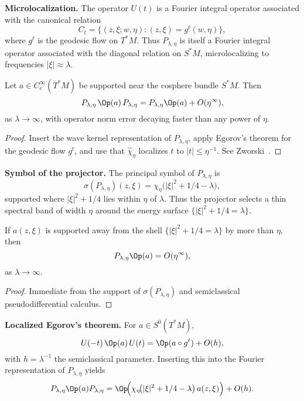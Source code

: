 \medskip

\noindent\textbf{Microlocalization.}
The operator $U(t)$ is a Fourier integral operator associated with the canonical relation
\[
  C_{t} = \{(z,\xi; w,\eta): (z,\xi) = g^{t}(w,\eta)\},
\]
where $g^{t}$ is the geodesic flow on $T^{*}M$.
Thus $P_{\lambda,\eta}$ is itself a Fourier integral operator associated with the diagonal relation on $S^{*}M$, microlocalizing to frequencies $|\xi|\approx \lambda$.

\begin{lemma}\label{lem:microlocal}
Let $a\in C_{c}^{\infty}(T^{*}M)$ be supported near the cosphere bundle $S^{*}M$.
Then
\[
  P_{\lambda,\eta}\,\Op(a)\,P_{\lambda,\eta} = P_{\lambda,\eta}\Op(a) + O(\eta^{\infty}),
\]
as $\lambda\to\infty$, with operator norm error decaying faster than any power of $\eta$.
\end{lemma}

\begin{proof}
Insert the wave kernel representation of $P_{\lambda,\eta}$, apply Egorov’s theorem for the geodesic flow $g^{t}$, and use that $\widehat{\chi}_{\eta}$ localizes $t$ to $|t|\le \eta^{-1}$.
See Zworski~\cite[Chapter~10]{Zworski2012}.
\end{proof}

\medskip

\noindent\textbf{Symbol of the projector.}
The principal symbol of $P_{\lambda,\eta}$ is
\[
  \sigma(P_{\lambda,\eta})(z,\xi) = \chi_{\eta}\!\big(|\xi|^{2}+1/4-\lambda\big),
\]
supported where $|\xi|^{2}+1/4$ lies within $\eta$ of $\lambda$.
Thus the projector selects a thin spectral band of width $\eta$ around the energy surface $\{|\xi|^{2}+1/4=\lambda\}$.

\begin{corollary}\label{cor:energy-localization}
If $a(z,\xi)$ is supported away from the shell $\{|\xi|^{2}+1/4=\lambda\}$ by more than $\eta$, then
\[
  P_{\lambda,\eta}\Op(a) = O(\eta^{\infty}),
\]
as $\lambda\to\infty$.
\end{corollary}

\begin{proof}
Immediate from the support of $\sigma(P_{\lambda,\eta})$ and semiclassical pseudodifferential calculus.
\end{proof}

\medskip

\noindent\textbf{Localized Egorov’s theorem.}
For $a\in S^{0}(T^{*}M)$,
\[
  U(-t)\,\Op(a)\,U(t) = \Op(a\circ g^{t}) + O(h),
\]
with $h=\lambda^{-1}$ the semiclassical parameter.
Inserting this into the Fourier representation of $P_{\lambda,\eta}$ yields
\[
  P_{\lambda,\eta}\Op(a)P_{\lambda,\eta}
  = \Op\!\Big(\chi_{\eta}\!\big(|\xi|^{2}+1/4-\lambda\big)\,a(z,\xi)\Big) + O(h).
\]

